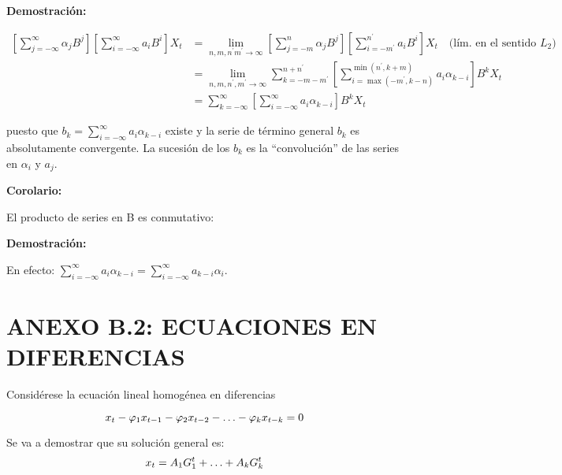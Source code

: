 \textbf{Demostraci\'{o}n:}

\begin{align*}
\left[\sum_{j=-\infty}^{\infty} \alpha_{j} B^{j} \right]\left[\sum_{i=-\infty}^{\infty} a_{i} B^{i} \right]X_{t} &= \lim_{n,m,n^{'} m^{'}\to \infty} \left[\sum_{j=-m}^n \alpha_{j}B^{j} \right]\left[\sum_{i=-m^{'}}^{n^{'}} a_{i}B^{i} \right]X_{t}\quad  \text{(l\'{i}m. en el sentido $L_{2}$)}\\
      &= \lim_{n,m,n^{'},m^{'} \to \infty} \sum_{k=-m-m^{'}}^{n+n^{'}} \left[\sum_{i=\max(-m^{'}, k-n)}^{\min (n^{'},k+m)} a_{i} \alpha_{k-i}\right]B^{k}X_{t}\\
      &= \sum_{k=-\infty}^{\infty}\left[\sum_{i=-\infty}^{\infty} a_{i} \alpha_{k-i} \right]B^{k}X_{t}
\end{align*}

puesto que $b_{k} =\displaystyle\sum_{i=-\infty}^{\infty} a_{i}\alpha_{k-i}$ existe y la serie de t\'{e}rmino general $b_{k}$ es absolutamente convergente. La sucesi\'{o}n de los $b_{k}$ es la ``convoluci\'{o}n'' de las series en $\alpha_{i}$ y $a_{j}$.\newline

\textbf{Corolario:}\newline

El producto de series en B es conmutativo:\newline

\textbf{Demostraci\'{o}n:}\newline

En efecto: $\sum\limits_{i=-\infty }^\infty {a_{i} \alpha_{k-i} } =\sum\limits_{i=-\infty }^\infty {a_{k-i} \alpha_{i} } $.\newline

\section*{ANEXO B.2: ECUACIONES EN DIFERENCIAS}
Consid\'{e}rese la ecuaci\'{o}n lineal homog\'{e}nea en diferencias

\begin{equation}{
\label{ecu:01}
x_{t} -\varphi_{1} x_{t-1} -\varphi_{2} x_{t-2} -\mathellipsis -\varphi _{k} x_{t-k} =0}
\end{equation}

Se va a demostrar que su soluci\'{o}n general es:
\begin{equation}{
\label{ecu:02}
x_{t} =A_{1} G_{1}^{t} +\mathellipsis +A_{k} G_{k}^{t}}
\end{equation}

